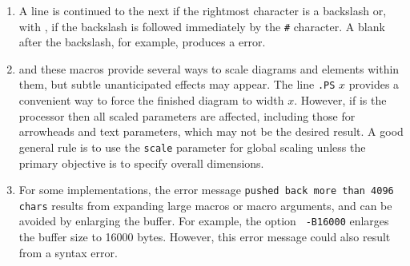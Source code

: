 \begin{enumerate}
\item
{}
 A line is continued to the next if the
  rightmost character is a backslash or, with \dpic, if the backslash is
  followed immediately by the {\tt \#} character.
  A blank after the backslash, for example, produces a \pic error.

\item
{}
 \Pic and these macros provide several ways to scale
  diagrams and elements within them, but subtle unanticipated effects
  may appear.  The line {\tt.PS} $x$ provides a convenient way to force
  the finished diagram to width $x.$  However, if \gpic is the
  \pic processor then all scaled parameters are affected, including those
  for arrowheads and text parameters, which may not be the desired
  result.  A good general rule is to use the {\tt scale} parameter for
  global scaling unless the primary objective is to specify overall
  dimensions.

\item
{}
 For some \Mfour implementations,
  the error message {\tt pushed back more than 4096 chars}
  results from expanding large macros or macro arguments, and can be
  avoided by enlarging the buffer.  For example, the option {\tt
  -B16000} enlarges the buffer size to 16000 bytes.  However, this
  error message could also result from a syntax error.

\end{enumerate}

